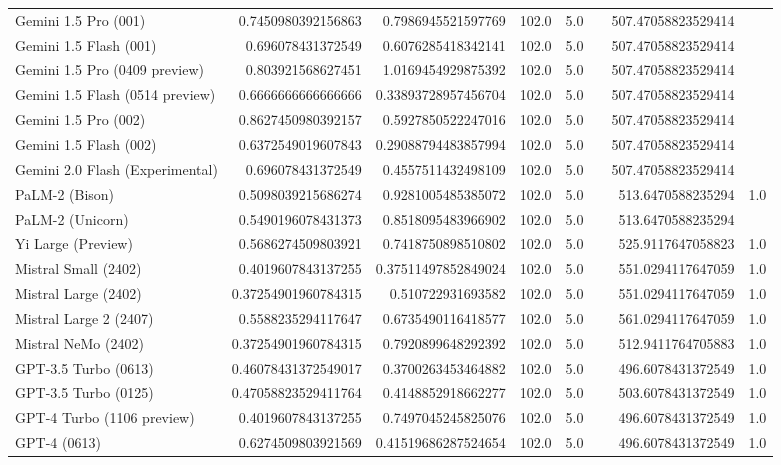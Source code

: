 \begin{table}[htp]
{\begin{tabular}{lrrrrrrr}
Gemini 1.5 Pro (001) & 0.7450980392156863 & 0.7986945521597769 & 102.0 & 5.0 &  & 507.47058823529414 &  \\
Gemini 1.5 Flash (001) & 0.696078431372549 & 0.6076285418342141 & 102.0 & 5.0 &  & 507.47058823529414 &  \\
Gemini 1.5 Pro (0409 preview) & 0.803921568627451 & 1.0169454929875392 & 102.0 & 5.0 &  & 507.47058823529414 &  \\
Gemini 1.5 Flash (0514 preview) & 0.6666666666666666 & 0.33893728957456704 & 102.0 & 5.0 &  & 507.47058823529414 &  \\
Gemini 1.5 Pro (002) & 0.8627450980392157 & 0.5927850522247016 & 102.0 & 5.0 &  & 507.47058823529414 &  \\
Gemini 1.5 Flash (002) & 0.6372549019607843 & 0.29088794483857994 & 102.0 & 5.0 &  & 507.47058823529414 &  \\
Gemini 2.0 Flash (Experimental) & 0.696078431372549 & 0.4557511432498109 & 102.0 & 5.0 &  & 507.47058823529414 &  \\
PaLM-2 (Bison) & 0.5098039215686274 & 0.9281005485385072 & 102.0 & 5.0 &  & 513.6470588235294 & 1.0 \\
PaLM-2 (Unicorn) & 0.5490196078431373 & 0.8518095483966902 & 102.0 & 5.0 &  & 513.6470588235294 &  \\
Yi Large (Preview) & 0.5686274509803921 & 0.7418750898510802 & 102.0 & 5.0 &  & 525.9117647058823 & 1.0 \\
Mistral Small (2402) & 0.4019607843137255 & 0.37511497852849024 & 102.0 & 5.0 &  & 551.0294117647059 & 1.0 \\
Mistral Large (2402) & 0.37254901960784315 & 0.510722931693582 & 102.0 & 5.0 &  & 551.0294117647059 & 1.0 \\
Mistral Large 2 (2407) & 0.5588235294117647 & 0.6735490116418577 & 102.0 & 5.0 &  & 561.0294117647059 & 1.0 \\
Mistral NeMo (2402) & 0.37254901960784315 & 0.7920899648292392 & 102.0 & 5.0 &  & 512.9411764705883 & 1.0 \\
GPT-3.5 Turbo (0613) & 0.46078431372549017 & 0.3700263453464882 & 102.0 & 5.0 &  & 496.6078431372549 & 1.0 \\
GPT-3.5 Turbo (0125) & 0.47058823529411764 & 0.4148852918662277 & 102.0 & 5.0 &  & 503.6078431372549 & 1.0 \\
GPT-4 Turbo (1106 preview) & 0.4019607843137255 & 0.7497045245825076 & 102.0 & 5.0 &  & 496.6078431372549 & 1.0 \\
GPT-4 (0613) & 0.6274509803921569 & 0.41519686287524654 & 102.0 & 5.0 &  & 496.6078431372549 & 1.0 \\

\end{tabular}}
\end{table}

